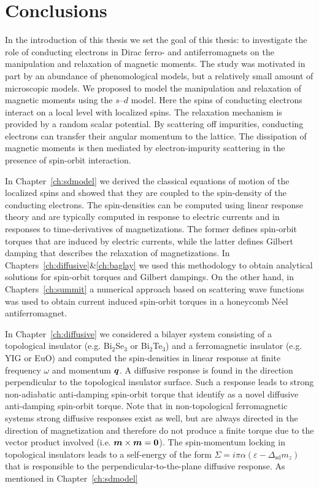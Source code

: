 \chapter{Conclusions}
In the introduction of this thesis we set the goal of this thesis: to investigate the role of conducting electrons in Dirac ferro- and antiferromagnets on the manipulation and relaxation of magnetic moments. The study was motivated in part by an abundance of phenomological models, but a relatively small amount of microscopic models. We proposed to model the manipulation and relaxation of magnetic moments using the $s$--$d$ model. Here the spins of conducting electrons interact on a local level with localized spins. The relaxation mechanism is provided by a random scalar potential. By scattering off impurities, conducting electrons can transfer their angular momentum to the lattice. The dissipation of magnetic moments is then mediated by electron-impurity scattering in the presence of spin-orbit interaction. 

In Chapter~\ref{ch:sdmodel} we derived the classical equations of motion of the localized spins and showed that they are coupled to the spin-density of the conducting electrons. The spin-densities can be computed using linear response theory and are typically computed in response to electric currents and in responses to time-derivatives of magnetizations. The former defines spin-orbit torques that are induced by electric currents, while the latter defines Gilbert damping that describes the relaxation of magnetizations. In Chapters~\ref{ch:diffusive}\&\ref{ch:baglay} we used this methodology to obtain analytical solutions for spin-orbit torques and Gilbert dampings. On the other hand, in Chapters~\ref{ch:summit} a numerical approach based on scattering wave functions was used to obtain current induced spin-orbit torques in a honeycomb N\'eel antiferromagnet. 


In Chapter~\ref{ch:diffusive} we considered a bilayer system consisting of a topological insulator (e.g. Bi$_2$Se$_3$ or Bi$_2$Te$_3$) and a ferromagnetic insulator (e.g. YIG or EuO) and computed the spin-densities in linear response at finite frequency $\omega$ and momentum $\boldsymbol{q}$. A diffusive response is found in the direction perpendicular to the topological insulator surface. Such a response leads to strong non-adiabatic anti-damping spin-orbit torque that identify as a novel diffusive anti-damping spin-orbit torque. Note that in non-topological ferromagnetic systems strong diffusive responses exist as well, but are always directed in the direction of magnetization and therefore do not produce a finite torque due to the vector product involved (i.e. $\boldsymbol{m}\times\boldsymbol{m}=\boldsymbol{0}$). The spin-momentum locking in topological insulators leads to a self-energy of the form $\Sigma = i\pi\alpha(\varepsilon-\Delta_\text{sd} m_z)$ that is responsible to the perpendicular-to-the-plane diffusive response. As mentioned in Chapter~\ref{ch:sdmodel} 

